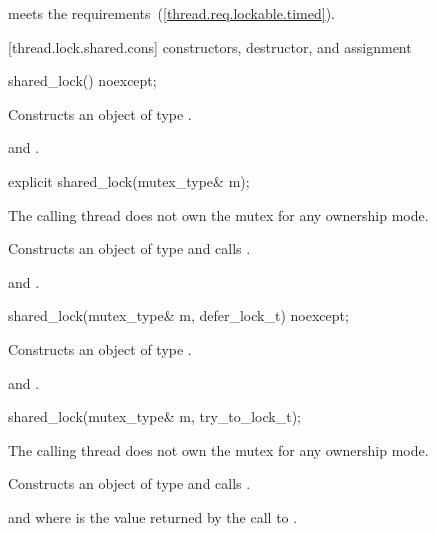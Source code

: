 \pnum
\begin{note}  meets the 
requirements~(\ref{thread.req.lockable.timed}). \end{note}

[thread.lock.shared.cons]{ constructors, destructor, and assignment}

%
\begin{itemdecl}
shared_lock() noexcept;
\end{itemdecl}

\begin{itemdescr}
\pnum
\effects Constructs an object of type .

\pnum
\postconditions {} and .
\end{itemdescr}

%
\begin{itemdecl}
explicit shared_lock(mutex_type& m);
\end{itemdecl}

\begin{itemdescr}
\pnum
\requires The calling thread does not own the mutex for any ownership mode.

\pnum
\effects Constructs an object of type  and calls .

\pnum
\postconditions {} and .
\end{itemdescr}

%
\begin{itemdecl}
shared_lock(mutex_type& m, defer_lock_t) noexcept;
\end{itemdecl}

\begin{itemdescr}
\pnum
\effects Constructs an object of type .

\pnum
\postconditions {} and .
\end{itemdescr}

%
\begin{itemdecl}
shared_lock(mutex_type& m, try_to_lock_t);
\end{itemdecl}

\begin{itemdescr}
\pnum
\requires The calling thread does not own the mutex for any ownership mode.

\pnum
\effects Constructs an object of type  and calls .

\pnum
\postconditions {} and 
where  is the
value returned by the call to .
\end{itemdescr}

